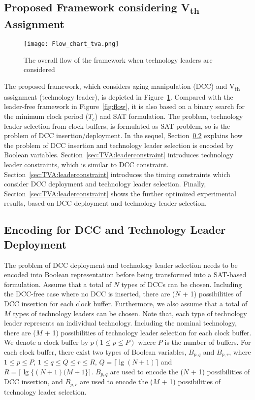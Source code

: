 \subsection{Proposed Framework considering V\textsubscript{th} Assignment}
\label{sec:TVA:framework}
\begin{figure}
	\centering
	\texttt{[image: Flow\_chart\_tva.png]}
	\caption{The overall flow of the framework when technology leaders are considered }
	\label{fig:flow:tva}
\end{figure}
The proposed framework, which considers aging manipulation (DCC) and V\textsubscript{th} assignment (technology leader), is depicted in Figure~\ref{fig:flow:tva}. Compared with the leader-free framework in Figure~\ref{fig:flow}, it is also based on a binary search for the minimum clock period ($T_c$) and SAT formulation. The problem, technology leader selection from clock buffers, is formulated as SAT problem, so is the problem of DCC insertion/deployment. In the sequel, Section~\ref{sec:TVA:leader_encode} explains how the problem of DCC insertion and technology leader selection is encoded by Boolean variables. Section~\ref{sec:TVA:leaderconstraint} introduces technology leader constraints, which is similar to DCC constraint. Section~\ref{sec:TVA:leaderconstraint} introduces the timing constraints which consider DCC deployment and technology leader selection. Finally,  Section~\ref{sec:TVA:leaderconstraint} shows the further optimized experimental results, based on DCC deployment and technology leader selection.

\subsection{Encoding for DCC and Technology Leader Deployment}
\label{sec:TVA:leader_encode}
The problem of DCC deployment and technology leader selection needs to be encoded into Boolean representation before being transformed into a SAT-based formulation. Assume that a total of $N$ types of DCCs can be chosen. Including the DCC-free case where no DCC is inserted, there are ($N$ + 1) possibilities of DCC insertion for each clock buffer. Furthermore, we also assume that a total of $M$ types of technology leaders can be chosen. Note that, each type of technology leader represents an individual technology. Including the nominal technology, there are ($M$ + 1) possibilities of technology leader selection for each clock buffer. We denote a clock buffer by $p\left(1 \leq p \leq P\right)$ where $P$ is the number of buffers. For each clock buffer, there exist two types of Boolean variables, $B_{p,q}$ and $B_{p,r}$, where $1 \leq p \leq P$, $1 \leq q \leq Q \leq r \leq R$, $Q = \lceil \lg (N + 1)\rceil$ and $R = \lceil \lg \{(N + 1)(M + 1\}\rceil$. $B_{p,q}$ are used to encode the ($N$ + 1) possibilities of DCC insertion, and $B_{p,r}$ are used to encode the ($M$ + 1) possibilities of technology leader selection.


